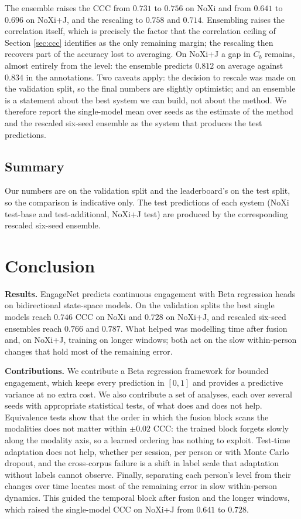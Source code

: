 \documentclass[10pt,a4paper,twocolumn]{article}
\begin{document}
	The ensemble raises the CCC from $0.731$ to $0.756$ on NoXi and from $0.641$ to $0.696$ on NoXi+J, and the rescaling to $0.758$ and $0.714$. Ensembling raises the correlation itself, which is precisely the factor that the correlation ceiling of Section \ref{sec:ccc} identifies as the only remaining margin; the rescaling then recovers part of the accuracy lost to averaging. On NoXi+J a gap in $C_b$ remains, almost entirely from the level: the ensemble predicts $0.812$ on average against $0.834$ in the annotations. Two caveats apply: the decision to rescale was made on the validation split, so the final numbers are slightly optimistic; and an ensemble is a statement about the best system we can build, not about the method. We therefore report the single-model mean over seeds as the estimate of the method and the rescaled six-seed ensemble as the system that produces the test predictions.

	\subsection{Summary}
	Our numbers are on the validation split and the leaderboard's on the test split, so the comparison is indicative only. The test predictions of each system (NoXi test-base and test-additional, NoXi+J test) are produced by the corresponding rescaled six-seed ensemble.


	\section{Conclusion}
	\label{sec:conclusion}
	\textbf{Results.} EngageNet predicts continuous engagement with Beta regression heads on bidirectional state-space models. On the validation splits the best single models reach $0.746$ CCC on NoXi and $0.728$ on NoXi+J, and rescaled six-seed ensembles reach $0.766$ and $0.787$. What helped was modelling time after fusion and, on NoXi+J, training on longer windows; both act on the slow within-person changes that hold most of the remaining error.

	\textbf{Contributions.} We contribute a Beta regression framework for bounded engagement, which keeps every prediction in $[0,1]$ and provides a predictive variance at no extra cost. We also contribute a set of analyses, each over several seeds with appropriate statistical tests, of what does and does not help. Equivalence tests show that the order in which the fusion block scans the modalities does not matter within $\pm 0.02$ CCC: the trained block forgets slowly along the modality axis, so a learned ordering has nothing to exploit. Test-time adaptation does not help, whether per session, per person or with Monte Carlo dropout, and the cross-corpus failure is a shift in label scale that adaptation without labels cannot observe. Finally, separating each person's level from their changes over time locates most of the remaining error in slow within-person dynamics. This guided the temporal block after fusion and the longer windows, which raised the single-model CCC on NoXi+J from $0.641$ to $0.728$.
\end{document}
